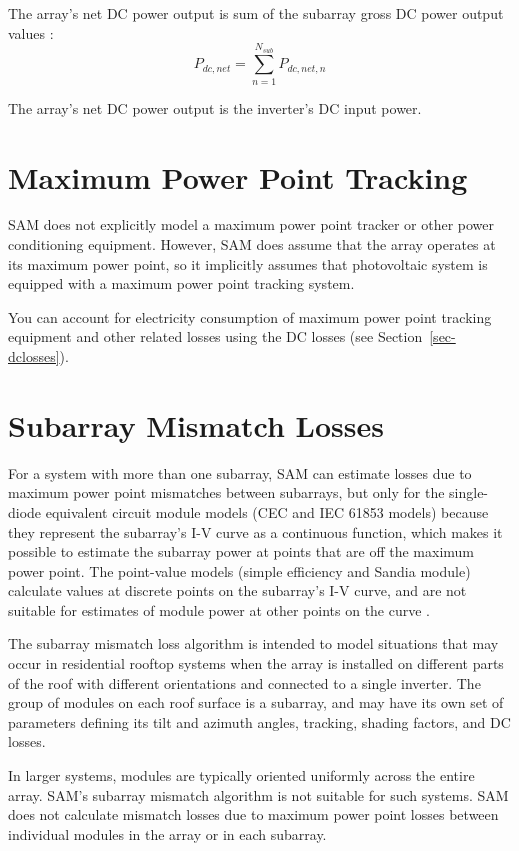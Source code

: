 \documentclass[12pt,letterpaper]{article}
\begin{document}
The array's net DC power output is sum of the subarray gross DC power output values :
\begin{equation}
P_{dc,net} = \sum_{n=1}^{N_{sub}} P_{dc,net,n}
\end{equation}

The array's net DC power output is the inverter's DC input power.

\section{Maximum Power Point Tracking}

SAM does not explicitly model a maximum power point tracker or other power conditioning equipment. However,  SAM does assume that the array operates at its maximum power point, so it implicitly assumes that photovoltaic system is equipped with a maximum power point tracking system. 

You can account for electricity consumption of maximum power point tracking equipment and other related losses using the DC losses (see Section~\ref{sec-dclosses}).

\section{Subarray Mismatch Losses}\label{sec-mismatch}

For a system with more than one subarray, SAM can estimate losses due to maximum power point mismatches between subarrays, but only for the single-diode equivalent circuit module models (CEC and IEC 61853 models) because they represent the subarray's I-V curve as a continuous function, which makes it possible to estimate the subarray power at points that are off the maximum power point. The point-value models (simple efficiency and Sandia module) calculate values at discrete points on the subarray's I-V curve, and are not suitable for estimates of module power at other points on the curve \citep{dobos2012b}.

The subarray mismatch loss algorithm \citep{dobos2012b} is intended to model situations that may occur in residential rooftop systems when the array is installed on different parts of the roof with different orientations and connected to a single inverter. The group of modules on each roof surface is a subarray, and may have its own set of parameters defining its tilt and azimuth angles, tracking, shading factors, and DC losses. 

In larger systems, modules are typically oriented uniformly across the entire array. SAM's subarray mismatch algorithm is not suitable for such systems. SAM does not calculate mismatch losses due to maximum power point losses between individual modules in the array or in each subarray.
\end{document}
